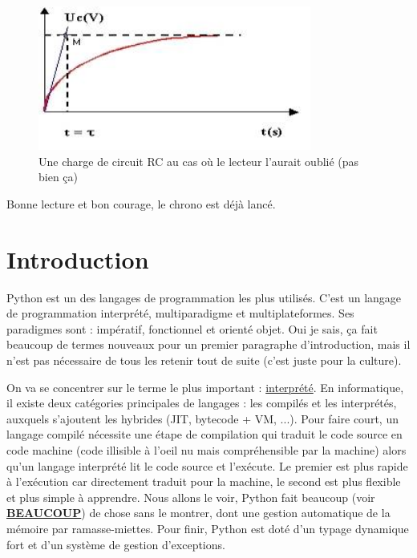\documentclass[a4paper,12pt]{article}
\begin{document}
\begin{figure}[H]
    \centering
    \includegraphics[keepaspectratio=true, width=0.8\textwidth]{../images/Charge_RC.jpg}
    \caption{Une charge de circuit RC au cas où le lecteur l'aurait oublié (pas bien ça)}
\end{figure}

\noindent Bonne lecture et bon courage, le chrono est déjà lancé.
\newpage

\tableofcontents %

\newpage

\section{Introduction}
Python est un des langages de programmation les plus utilisés.
C'est un langage de programmation interprété, multiparadigme et multiplateformes. Ses paradigmes sont : impératif, fonctionnel et orienté objet. 
Oui je sais, ça fait beaucoup de termes nouveaux pour un premier paragraphe d'introduction, mais il n'est pas nécessaire de tous les retenir tout de suite (c'est juste pour la culture).

On va se concentrer sur le terme le plus important : \underline{interprété}. En informatique, il existe deux catégories principales de langages : les compilés et les interprétés, auxquels s'ajoutent les hybrides (JIT, bytecode + VM, ...). Pour faire court, un langage compilé nécessite une étape de compilation qui traduit le code source en code machine (code illisible à l'oeil nu mais compréhensible par la machine) alors qu'un langage interprété lit le code source et l'exécute. Le premier est plus rapide à l'exécution car directement traduit pour la machine, le second est plus flexible et plus simple à apprendre. Nous allons le voir, Python fait beaucoup (voir \textbf{\underline{BEAUCOUP}}) de chose sans le montrer, dont une gestion automatique de la mémoire par ramasse-miettes. Pour finir, Python est doté d'un typage dynamique fort et d'un système de gestion d'exceptions.
\end{document}
